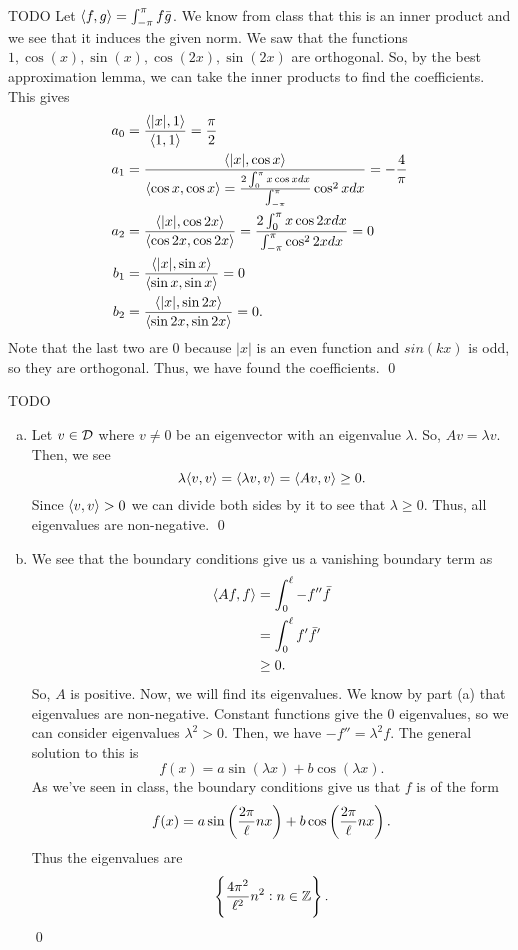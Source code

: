 \documentclass{article}
\begin{document}
\newpage
{} TODO
 \tri
\hop 
\solution
Let $\ang{f,g} = \int_{-\pi}^\pi f\bar{g}$. We know from class that this is an inner product and we see that it induces the given norm. We saw that the functions $1, \cos(x), \sin(x), \cos(2x), \sin(2x)$ are orthogonal. So, by the best approximation lemma, we can take the inner products to find the coefficients. This gives 
\begin{align*}
    a_0 &= \frac{\ang{|x|, 1}}{\ang{1,1}} = \frac{\pi}{2}\\
    a_1 &= \frac{\ang{|x|, \cos x}}{\ang{\cos x, \cos x} = \frac{2\int_0^\pi x \cos x dx}{\int_{-\pi}^\pi}\cos^2 x dx} = -\frac{4}{\pi} \\
    a_2 &= \frac{\ang{|x|, \cos 2x}}{\ang{\cos 2x, \cos 2x}} = \frac{2\int_0^\pi x \cos 2x dx}{\int_{-\pi}^\pi\cos^2 2x dx} = 0\\
    b_1 &= \frac{\ang{|x|, \sin x}}{\ang{\sin x, \sin x}} = 0 \\
    b_2&= \frac{\ang{|x|, \sin 2x}}{\ang{\sin 2x, \sin 2x}} = 0.
\end{align*}
Note that the last two are 0 because $|x|$ is an even function and $sin(kx)$ is odd, so they are orthogonal. Thus, we have found the coefficients. \qed


\newpage
{} TODO
 \tri
\hop 
\solution
\begin{enumerate}[(a)]
    \item Let $v \in \cal{D}$ where $v \ne 0$ be an eigenvector with an eigenvalue $\lambda$. So, $Av = \lambda v$. Then, we see 
    \[\lambda \ang{v,v} = \ang{\lambda v, v} = \ang{Av, v} \ge 0.\]
    Since $\ang{v,v} >0$ we can divide both sides by it to see that $\lambda \ge 0$. Thus, all eigenvalues are non-negative. \qed
    \item We see that the boundary conditions give us a vanishing boundary term as 
    \begin{align*}
        \ang{Af, f} &= \int_0^\ell -f''\bar{f} \\
        &=  \int_0^\ell f'\bar{f}'\\
        &\ge 0.
    \end{align*}
    So, $A$ is positive. 
    \hop
    Now, we will find its eigenvalues. We know by part (a) that eigenvalues are non-negative. Constant functions give the 0 eigenvalues, so we can consider eigenvalues $\lambda^2 >0$. Then, we have $-f'' = \lambda^2 f$. The general solution to this is 
    \[f(x) = a\sin(\lambda x) + b \cos(\lambda x).\]
    As we've seen in class, the boundary conditions give us that $f$ is of the form
    \[f(x) = a\sin\del{\frac{2\pi}{\ell}nx}+b\cos\del{\frac{2\pi}{\ell}nx}.\]
    Thus the eigenvalues are 
    \[\cbr{\frac{4\pi^2}{\ell^2}n^2: n \in \ZZ}.\]
    \qed
\end{enumerate}
\end{document}
